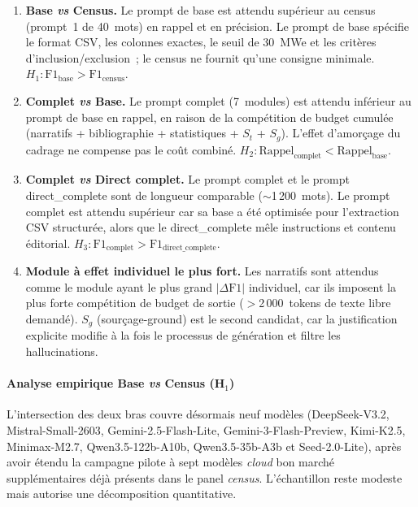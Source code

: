 \begin{enumerate}
\item \textbf{Base \emph{vs} Census.} Le prompt de base est attendu supérieur
  au census (prompt~1 de 40~mots) en rappel et en précision. Le prompt de base
  spécifie le format CSV, les colonnes exactes, le seuil de 30~MWe et les
  critères d'inclusion/exclusion~; le census ne fournit qu'une consigne
  minimale. $H_1 : \text{F1}_{\text{base}} > \text{F1}_{\text{census}}$.

\item \textbf{Complet \emph{vs} Base.} Le prompt complet (7~modules) est
  attendu inférieur au prompt de base en rappel, en raison de la compétition
  de budget cumulée (narratifs + bibliographie + statistiques + $S_t$ + $S_g$).
  L'effet d'amorçage du cadrage ne compense pas le coût combiné.
  $H_2 : \text{Rappel}_{\text{complet}} < \text{Rappel}_{\text{base}}$.

\item \textbf{Complet \emph{vs} Direct complet.} Le prompt complet et le prompt
  direct\_complete sont de longueur comparable ($\sim$1\,200~mots). Le prompt complet
  est attendu supérieur car sa base a été optimisée pour l'extraction CSV
  structurée, alors que le direct\_complete mêle instructions et contenu éditorial.
  $H_3 : \text{F1}_{\text{complet}} > \text{F1}_{\text{direct\_complete}}$.

\item \textbf{Module à effet individuel le plus fort.} Les narratifs sont
  attendus comme le module ayant le plus grand $|\Delta\text{F1}|$ individuel,
  car ils imposent la plus forte compétition de budget de sortie
  ($>$2\,000~tokens de texte libre demandé). $S_g$ (sourçage-ground) est le
  second candidat, car la justification explicite modifie à la fois le
  processus de génération et filtre les hallucinations.
\end{enumerate}

\paragraph{Analyse empirique Base \emph{vs} Census (H$_1$)}

L'intersection des deux bras couvre désormais neuf modèles (DeepSeek-V3.2,
Mistral-Small-2603, Gemini-2.5-Flash-Lite, Gemini-3-Flash-Preview,
Kimi-K2.5, Minimax-M2.7, Qwen3.5-122b-A10b, Qwen3.5-35b-A3b et
Seed-2.0-Lite), après avoir étendu la campagne pilote à sept modèles
\emph{cloud} bon marché supplémentaires déjà présents dans le panel
\emph{census}. L'échantillon reste modeste mais autorise une décomposition
quantitative.

